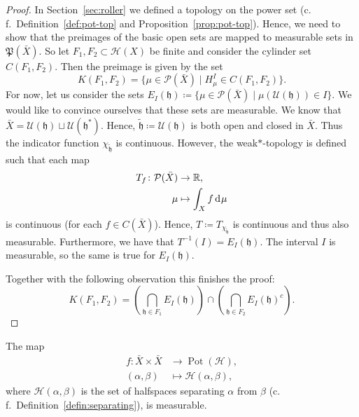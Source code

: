 \begin{proof}
  In Section~\ref{sec:roller} we defined a topology on the power set (c.\,f.\ Definition~\ref{def:pot-top} and Proposition~\ref{prop:pot-top}). Hence, we need to show that the preimages of the basic open sets are mapped to measurable sets in \(\mathfrak{P}(\bar X)\). So let \(F_1, F_2 \subset \mathcal{H}(X)\) be finite and consider the cylinder set \(C(F_1, F_2)\). Then the preimage is given by the set
  \[
    K(F_1, F_2) = \{\mu \in \mathcal{P}(\bar X) \mid H^I_\mu \in C(F_1, F_2)\}.
  \]
  For now, let us consider the sets \(E_I(\mathfrak{h}) \coloneqq \{\mu \in \mathcal{P}(\bar X) \mid \mu(\mathcal{U}(\mathfrak{h})) \in I\}\). We would like to convince ourselves that these sets are measurable. We know that \(\bar X = \mathcal{U}(\mathfrak{h}) \sqcup \mathcal{U}(\mathfrak{h}^\ast)\). Hence, \(\mathfrak{\tilde h} \coloneqq \mathcal{U}(\mathfrak{h})\) is both open and closed in \(\bar X\). Thus the indicator function \(\chi_{\mathfrak{\tilde h}}\) is continuous. However, the weak\(\ast\)-topology is defined such that each map
  \begin{align*}
    T_f\colon \mathcal{P}(\bar X) &\to \R,\\
    \mu &\mapsto \int_X f \d\mu
  \end{align*}
  is continuous (for each \(f \in C(\bar X)\)). Hence, \(T \coloneqq T_{\chi_{\mathfrak{\tilde h}}}\) is continuous and thus also measurable. Furthermore, we have that \(T^{-1}(I) = E_I(\mathfrak{h})\). The interval \(I\) is measurable, so the same is true for \(E_I(\mathfrak{h})\).

  Together with the following observation this finishes the proof:
  \[
    K(F_1, F_2) = \left (\bigcap_{\mathfrak{h} \in F_1} E_I(\mathfrak{h}) \right ) \cap \left ( \bigcap_{\mathfrak{h} \in F_2} E_I(\mathfrak{h})^{c}\right).
  \]
\end{proof}


\begin{lemma}
  The map
  \begin{align*}
    f\colon \bar X \times \bar X &\to \operatorname{Pot}(\mathcal{H}),\\
    (\alpha, \beta) &\mapsto \mathcal{H}(\alpha, \beta),
  \end{align*}
  where \(\mathcal{H}(\alpha, \beta)\) is the set of halfspaces separating \(\alpha\) from \(\beta\) (c.\,f.\ Definition~\ref{defin:separating}),  is measurable.
\end{lemma}

